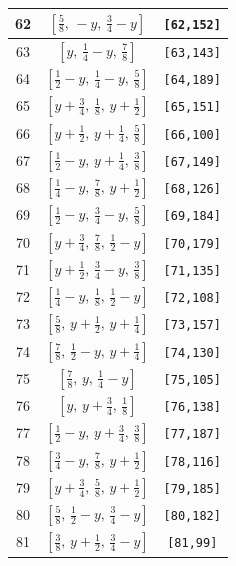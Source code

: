 \documentclass[fleqn,8pt]{jsarticle}
\begin{document}
\begin{longtable}{ccc}
62 & $\left[ \frac{5}{8},\, - y,\, \frac{3}{4} - y \right]$ & {\tt [62,152]} \\ \hline
63 & $\left[ y,\, \frac{1}{4} - y,\, \frac{7}{8} \right]$ & {\tt [63,143]} \\ \hline
64 & $\left[ \frac{1}{2} - y,\, \frac{1}{4} - y,\, \frac{5}{8} \right]$ & {\tt [64,189]} \\ \hline
65 & $\left[ y + \frac{3}{4},\, \frac{1}{8},\, y + \frac{1}{2} \right]$ & {\tt [65,151]} \\ \hline
66 & $\left[ y + \frac{1}{2},\, y + \frac{1}{4},\, \frac{5}{8} \right]$ & {\tt [66,100]} \\ \hline
67 & $\left[ \frac{1}{2} - y,\, y + \frac{1}{4},\, \frac{3}{8} \right]$ & {\tt [67,149]} \\ \hline
68 & $\left[ \frac{1}{4} - y,\, \frac{7}{8},\, y + \frac{1}{2} \right]$ & {\tt [68,126]} \\ \hline
69 & $\left[ \frac{1}{2} - y,\, \frac{3}{4} - y,\, \frac{5}{8} \right]$ & {\tt [69,184]} \\ \hline
70 & $\left[ y + \frac{3}{4},\, \frac{7}{8},\, \frac{1}{2} - y \right]$ & {\tt [70,179]} \\ \hline
71 & $\left[ y + \frac{1}{2},\, \frac{3}{4} - y,\, \frac{3}{8} \right]$ & {\tt [71,135]} \\ \hline
72 & $\left[ \frac{1}{4} - y,\, \frac{1}{8},\, \frac{1}{2} - y \right]$ & {\tt [72,108]} \\ \hline
73 & $\left[ \frac{5}{8},\, y + \frac{1}{2},\, y + \frac{1}{4} \right]$ & {\tt [73,157]} \\ \hline
74 & $\left[ \frac{7}{8},\, \frac{1}{2} - y,\, y + \frac{1}{4} \right]$ & {\tt [74,130]} \\ \hline
75 & $\left[ \frac{7}{8},\, y,\, \frac{1}{4} - y \right]$ & {\tt [75,105]} \\ \hline
76 & $\left[ y,\, y + \frac{3}{4},\, \frac{1}{8} \right]$ & {\tt [76,138]} \\ \hline
77 & $\left[ \frac{1}{2} - y,\, y + \frac{3}{4},\, \frac{3}{8} \right]$ & {\tt [77,187]} \\ \hline
78 & $\left[ \frac{3}{4} - y,\, \frac{7}{8},\, y + \frac{1}{2} \right]$ & {\tt [78,116]} \\ \hline
79 & $\left[ y + \frac{3}{4},\, \frac{5}{8},\, y + \frac{1}{2} \right]$ & {\tt [79,185]} \\ \hline
80 & $\left[ \frac{5}{8},\, \frac{1}{2} - y,\, \frac{3}{4} - y \right]$ & {\tt [80,182]} \\ \hline
81 & $\left[ \frac{3}{8},\, y + \frac{1}{2},\, \frac{3}{4} - y \right]$ & {\tt [81,99]} \\ \hline

\end{longtable}
\end{document}
